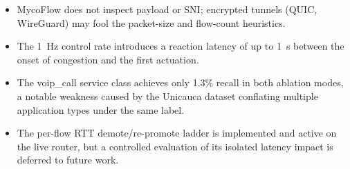 \begin{itemize}
  \item MycoFlow does not inspect payload or SNI; encrypted tunnels (QUIC, WireGuard) may fool the packet-size and flow-count heuristics.
  \item The 1~Hz control rate introduces a reaction latency of up to 1~s between the onset of congestion and the first actuation.
  \item The voip\_call service class achieves only 1.3\% recall in both ablation modes, a notable weakness caused by the Unicauca dataset conflating multiple application types under the same label.
  \item The per-flow RTT demote/re-promote ladder is implemented and active on the live router, but a controlled evaluation of its isolated latency impact is deferred to future work.
\end{itemize}
